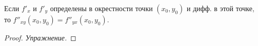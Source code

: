 \begin{theorem}
    Если $f'_x$ и $f'_y$ определены в окрестности точки $(x_0, y_0)$
    и дифф. в этой точке, то $f''_{xy}(x_0, y_0) = f''_{yx}(x_0, y_0)$.
\end{theorem}
\begin{proof}
    \textit{Упражнение.}
\end{proof}
